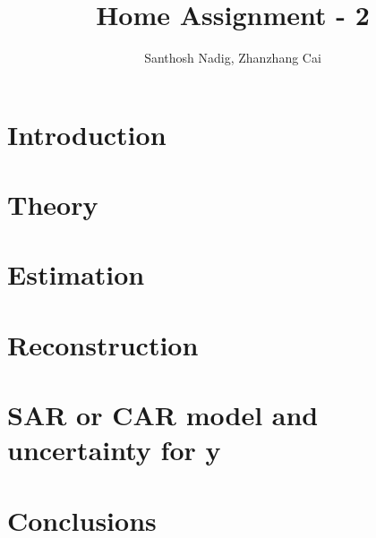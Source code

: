 \documentclass[a4paper,10pt]{article}
\title{Home Assignment - 2}
\author{Santhosh Nadig, Zhanzhang Cai}
\begin{document}
\maketitle

\section{Introduction}

\section{Theory}

\section{Estimation}

\section{Reconstruction}

\section{SAR or CAR model and uncertainty for y}

\section{Conclusions}
\end{document}
